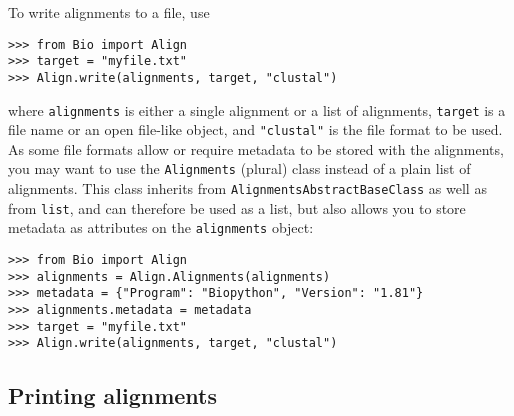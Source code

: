 To write alignments to a file, use
\begin{verbatim}
>>> from Bio import Align
>>> target = "myfile.txt"
>>> Align.write(alignments, target, "clustal")
\end{verbatim}
where \verb|alignments| is either a single alignment or a list of alignments, \verb|target| is a file name or an open file-like object, and \verb|"clustal"| is the file format to be used. As some file formats allow or require metadata to be stored with the alignments, you may want to use the \verb|Alignments| (plural) class instead of a plain list of alignments. This class inherits from \verb|AlignmentsAbstractBaseClass| as well as from \verb|list|, and can therefore be used as a list, but also allows you to store metadata as attributes on the \verb|alignments| object:
\begin{verbatim}
>>> from Bio import Align
>>> alignments = Align.Alignments(alignments)
>>> metadata = {"Program": "Biopython", "Version": "1.81"}
>>> alignments.metadata = metadata
>>> target = "myfile.txt"
>>> Align.write(alignments, target, "clustal")
\end{verbatim}

\subsection{Printing alignments}
\label{subsec:align_printing}

